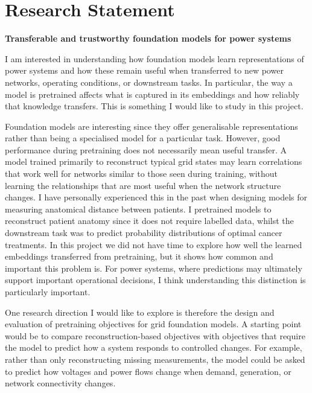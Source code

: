 \documentclass[11pt,a4paper]{moderncv}
\begin{document}
\makecvtitle


\section*{Research Statement}

\textbf{Transferable and trustworthy foundation models for power systems}

I am interested in understanding how foundation models learn representations of power systems and how these remain useful when transferred to new power networks, operating conditions, or downstream tasks. In particular, the way a model is pretrained affects what is captured in its embeddings and how reliably that knowledge transfers. This is something I would like to study in this project.

\vspace{4pt}
\hspace*{2em}
Foundation models are interesting since they offer generalisable representations rather than being a specialised model for a particular task. However, good performance during pretraining does not necessarily mean useful transfer. A model trained primarily to reconstruct typical grid states may learn correlations that work well for networks similar to those seen during training, without learning the relationships that are most useful when the network structure changes. I have personally experienced this in the past when designing models for measuring anatomical distance between patients. I pretrained models to reconstruct patient anatomy since it does not require labelled data, whilst the downstream task was to predict probability distributions of optimal cancer treatments. In this project we did not have time to explore how well the learned embeddings transferred from pretraining, but it shows how common and important this problem is. For power systems, where predictions may ultimately support important operational decisions, I think understanding this distinction is particularly important.

\vspace{4pt}
\hspace*{2em}
One research direction I would like to explore is therefore the design and evaluation of pretraining objectives for grid foundation models. A starting point would be to compare reconstruction-based objectives with objectives that require the model to predict how a system responds to controlled changes. For example, rather than only reconstructing missing measurements, the model could be asked to predict how voltages and power flows change when demand, generation, or network connectivity changes.
\end{document}
